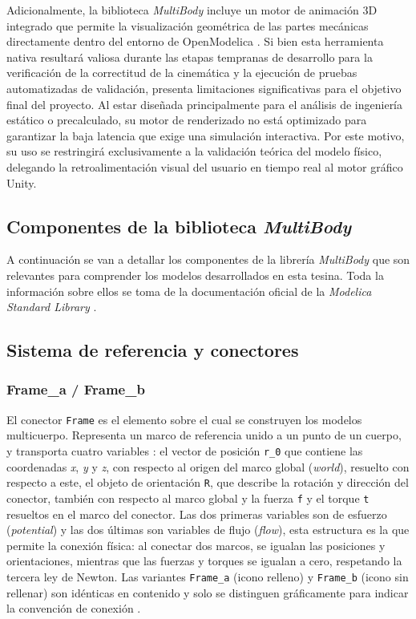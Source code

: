 Adicionalmente, la biblioteca \textit{MultiBody} incluye un motor de animación 3D integrado que permite la visualización geométrica de las partes mecánicas directamente dentro del entorno de OpenModelica  \cite{msl_multibody}. Si bien esta herramienta nativa resultará valiosa durante las etapas tempranas de desarrollo para la verificación de la correctitud de la cinemática y la ejecución de pruebas automatizadas de validación, presenta limitaciones significativas para el objetivo final del proyecto. Al estar diseñada principalmente para el análisis de ingeniería estático o precalculado, su motor de renderizado no está optimizado para garantizar la baja latencia que exige una simulación interactiva. Por este motivo, su uso se restringirá exclusivamente a la validación teórica del modelo físico, delegando la retroalimentación visual del usuario en tiempo real al motor gráfico Unity. \\

\subsection{Componentes de la biblioteca \textit{MultiBody}}

A continuación se van a detallar los componentes de la librería \textit{MultiBody} que son relevantes para comprender los modelos desarrollados en esta tesina. Toda la información sobre ellos se toma de la documentación oficial de la \textit{Modelica Standard Library} \cite{msl_multibody, otter2003}.

\subsection*{Sistema de referencia y conectores}



\subsubsection{Frame\_a / Frame\_b} 
El conector \verb|Frame| es el elemento sobre el cual se construyen los modelos multicuerpo. Representa un marco de referencia unido a un punto de un cuerpo, y transporta cuatro variables  \cite{msl_multibody}: el vector de posición \verb|r_0| que contiene las coordenadas \textit{x}, \textit{y} y \textit{z}, con respecto al origen del marco global (\textit{world}), resuelto con respecto a este, el objeto de orientación \verb|R|, que describe la rotación y dirección del conector, también con respecto al marco global y la fuerza \verb|f| y el torque \verb|t| resueltos en el marco del conector. Las dos primeras variables son de esfuerzo (\textit{potential}) y las dos últimas son variables de flujo (\textit{flow}), esta estructura es la que permite la conexión física: al conectar dos marcos, se igualan las posiciones y orientaciones, mientras que las fuerzas y torques se igualan a cero, respetando la tercera ley de Newton.  Las variantes \verb|Frame_a| (icono relleno) y \verb|Frame_b| (icono sin rellenar) son idénticas en contenido y solo se distinguen gráficamente para indicar la convención de conexión \cite{msl_multibody}.




